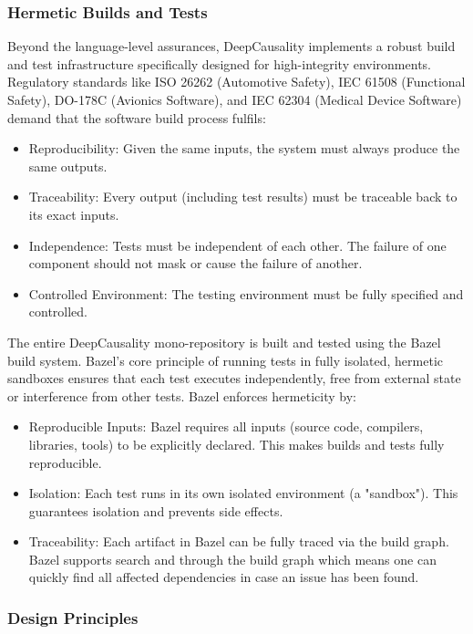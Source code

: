 \subsubsection{Hermetic Builds and Tests}

Beyond the language-level assurances, DeepCausality implements a robust build and test infrastructure specifically designed for high-integrity environments. Regulatory standards like ISO 26262 (Automotive Safety), IEC 61508 (Functional Safety), DO-178C (Avionics Software), and IEC 62304 (Medical Device Software) demand that the software build process fulfils:

\begin{itemize}
	\item Reproducibility: Given the same inputs, the system must always produce the same outputs. 
	\item Traceability: Every output (including test results) must be traceable back to its exact inputs.
	\item Independence: Tests must be independent of each other. The failure of one component should not mask or cause the failure of another.
	\item Controlled Environment: The testing environment must be fully specified and controlled.
\end{itemize}


The entire DeepCausality mono-repository is built and tested using the Bazel build system. Bazel's core principle of running tests in fully isolated, hermetic sandboxes ensures that each test executes independently, free from external state or interference from other tests. Bazel enforces hermeticity by:

\begin{itemize}
	\item Reproducible Inputs: Bazel requires all inputs (source code, compilers, libraries, tools) to be explicitly declared. This makes builds and tests fully reproducible.
	\item Isolation: Each test runs in its own isolated environment (a "sandbox"). This guarantees isolation and prevents side effects.
	\item Traceability: Each artifact in Bazel can be fully traced via the build graph. Bazel supports search and through the build graph which means one can quickly find all affected dependencies in case an issue has been found. 
\end{itemize}

\subsubsection{Design Principles}

